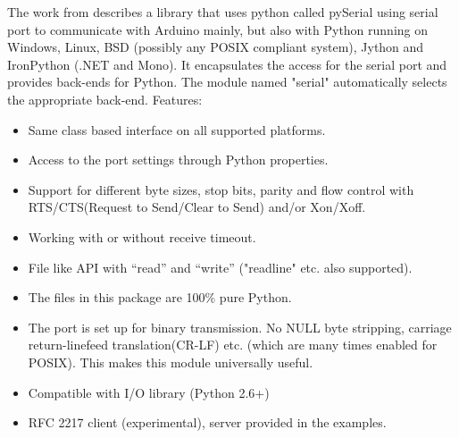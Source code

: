 \documentclass{acm_proc_article-sp}
\begin{document}
The work from \cite{dearduino} describes a library that uses python called pySerial using serial port to communicate with Arduino mainly, but also with Python running on Windows, Linux, BSD (possibly any POSIX compliant system), Jython and IronPython (.NET and Mono). It encapsulates the access for the serial port and provides back-ends for Python. The module named "serial" automatically selects the appropriate back-end.
\newline
\newline
Features:
\begin{itemize}
\item Same class based interface on all supported platforms.
\item Access to the port settings through Python properties.
\item Support for different byte sizes, stop bits, parity and flow control with RTS/CTS(Request to Send/Clear to Send) and/or Xon/Xoff.
\item Working with or without receive timeout.
\item File like API with “read” and “write” ("readline" etc. also supported).
\item The files in this package are 100\% pure Python.
\item The port is set up for binary transmission. No NULL byte stripping, carriage return-linefeed translation(CR-LF) etc. (which are many times enabled for POSIX). This makes this module universally useful.
\item Compatible with I/O library (Python 2.6+)
\item RFC 2217 client (experimental), server provided in the examples.
\end{itemize}
\end{document}
